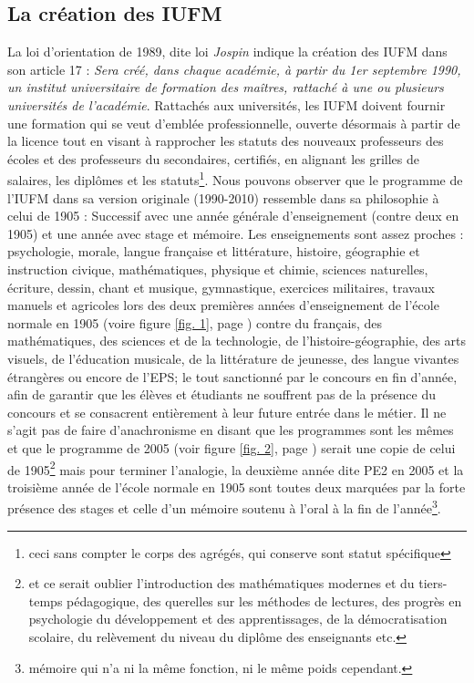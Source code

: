 \documentclass[a4paper,11pt]{article}
\begin{document}
			\subsection{La création des IUFM}
			La loi d'orientation de 1989, dite loi \emph{Jospin} indique la création des IUFM dans son article 17 : \emph{Sera créé, dans chaque académie, à partir du 1er septembre 1990, un institut universitaire de formation des maîtres, rattaché à une ou plusieurs universités de l'académie}. Rattachés aux universités, les IUFM doivent fournir une formation qui se veut d'emblée professionnelle, ouverte désormais à partir de la licence tout en visant à rapprocher les statuts des nouveaux professeurs des écoles et des professeurs du secondaires, certifiés, en alignant les grilles de salaires, les diplômes et les statuts\footnote{ceci sans compter le corps des agrégés, qui conserve sont statut spécifique}. Nous pouvons observer que le programme de l'IUFM dans sa version originale (1990-2010) ressemble dans sa philosophie à celui de 1905 : Successif avec une année générale d'enseignement (contre deux en 1905) et une année avec stage et mémoire. Les enseignements sont assez proches :  psychologie, morale, langue française et littérature, histoire, géographie et instruction civique, mathématiques, physique et chimie, sciences naturelles, écriture, dessin, chant et musique, gymnastique, exercices militaires, travaux manuels et agricoles lors des deux premières années d'enseignement de l'école normale en 1905 (voire figure \ref{fig. 1}, page \pageref{fig. 1}) contre du français, des mathématiques, des sciences et de la technologie, de l'histoire-géographie, des arts visuels, de l'éducation musicale, de la littérature de jeunesse, des langue vivantes étrangères ou encore de l'EPS; le tout sanctionné par le concours en fin d'année, afin de garantir que les élèves et étudiants ne souffrent pas de la présence du concours et se consacrent entièrement à leur future entrée dans le métier. Il ne s'agit pas de faire d'anachronisme en disant que les programmes sont les mêmes et que le programme de 2005 (voir figure \ref{fig. 2}, page \pageref{fig. 2}) serait une copie de celui de 1905\footnote{et ce serait oublier l'introduction des mathématiques modernes et du tiers-temps pédagogique, des querelles sur les méthodes de lectures, des progrès en psychologie du développement et des apprentissages, de la démocratisation scolaire, du relèvement du niveau du diplôme des enseignants etc.} mais pour terminer l'analogie, la deuxième année dite PE2 en 2005 et la troisième année de l'école normale en 1905 sont toutes deux marquées par la forte présence des stages et celle d'un mémoire soutenu à l'oral à la fin de l'année\footnote{mémoire qui n'a ni la même fonction, ni le même poids cependant.}.
\end{document}
